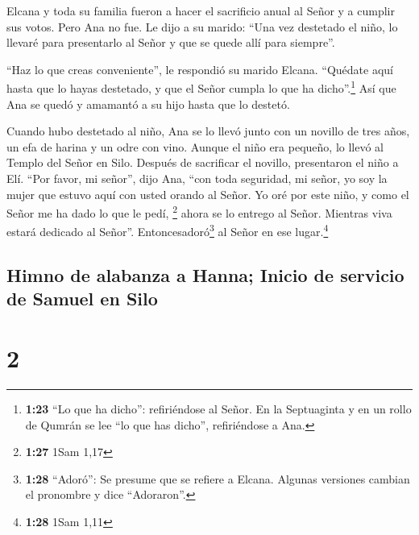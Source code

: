  Elcana y toda su familia fueron a hacer el sacrificio
anual al Señor y a cumplir sus votos.  Pero Ana no fue.
Le dijo a su marido: ``Una vez destetado el niño, lo llevaré para
presentarlo al Señor y que se quede allí para siempre''.

 ``Haz lo que creas conveniente'', le respondió su marido
Elcana. ``Quédate aquí hasta que lo hayas destetado, y que el Señor
cumpla lo que ha dicho''.\footnote{\textbf{1:23} ``Lo que ha dicho'':
  refiriéndose al Señor. En la Septuaginta y en un rollo de Qumrán se
  lee ``lo que has dicho'', refiriéndose a Ana.} Así que Ana se quedó y
amamantó a su hijo hasta que lo destetó.

 Cuando hubo destetado al niño, Ana se lo llevó junto con
un novillo de tres años, un efa de harina y un odre con vino. Aunque el
niño era pequeño, lo llevó al Templo del Señor en Silo. 
Después de sacrificar el novillo, presentaron el niño a Elí.
 ``Por favor, mi señor'', dijo Ana, ``con toda seguridad,
mi señor, yo soy la mujer que estuvo aquí con usted orando al Señor.
 Yo oré por este niño, y como el Señor me ha dado lo que
le pedí, \footnote{\textbf{1:27} 1Sam 1,17}  ahora se lo
entrego al Señor. Mientras viva estará dedicado al Señor''.
Entoncesadoró\footnote{\textbf{1:28} ``Adoró'': Se presume que se
  refiere a Elcana. Algunas versiones cambian el pronombre y dice
  ``Adoraron''.} al Señor en ese lugar.\footnote{\textbf{1:28} 1Sam 1,11}

\hypertarget{himno-de-alabanza-a-hanna-inicio-de-servicio-de-samuel-en-silo}{%
\subsection{Himno de alabanza a Hanna; Inicio de servicio de Samuel en
Silo}\label{himno-de-alabanza-a-hanna-inicio-de-servicio-de-samuel-en-silo}}

\hypertarget{section-1}{%
\section{2}\label{section-1}}

